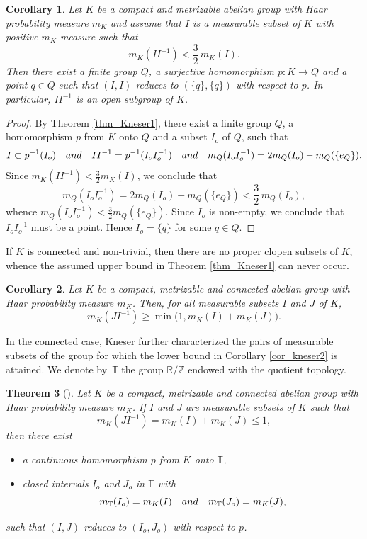 \documentclass[11pt]{article}
\numberwithin{equation}{section}
\newcommand{\bR}{\mathbb{R}}
\newcommand{\bT}{\mathbb{T}}
\newcommand{\bZ}{\mathbb{Z}}
\newcommand{\qand}{\quad\textup{and}\quad}
\theoremstyle{plain}
\newtheorem{theorem}{Theorem}[section]
\newtheorem{corollary}[theorem]{Corollary}
\theoremstyle{definition}
\begin{document}
\begin{corollary}
\label{cor_kneser1}
Let $K$ be a compact and metrizable abelian group with Haar probability measure $m_K$ and assume that $I$ is a measurable
subset of $K$ with positive $m_K$-measure such that
\[
m_K(II^{-1}) < \frac{3}{2}\, m_K(I).
\]
Then there exist a finite group $Q$, a surjective homomorphism $p : K \to Q$ and a point $q \in Q$ such that $(I,I)$ reduces
to $(\{q\},\{q\})$ with respect to $p$. In particular, $II^{-1}$ is an open subgroup of $K$.
\end{corollary}

\begin{proof}
By Theorem \ref{thm_Kneser1}, there exist a finite group $Q$, a homomorphism $p$ from $K$ onto $Q$ and
a subset $I_o$ of $Q$, such that
\[
I \subset p^{-1}(I_o) \qand II^{-1} = p^{-1}(I_o I_o^{-1}) \qand m_Q(I_o I_o^{-1}) = 2m_Q(I_o) - m_Q(\{e_Q\}).
\]
Since $m_K(II^{-1}) < \frac{3}{2} m_K(I)$, we conclude that
\begin{equation}
\label{Qbnd}
m_Q(I_o I_o^{-1}) = 2m_Q(I_o) - m_Q(\{e_Q\}) < \frac{3}{2}\, m_Q(I_o),
\end{equation}
whence $m_Q(I_o I_o^{-1}) < \frac{3}{2} m_Q(\{e_Q\})$. Since $I_o$ is non-empty, we conclude that $I_o I_o^{-1}$ must be a
point. Hence $I_o = \{q\}$ for some $q \in Q$.
\end{proof}

If $K$ is connected and non-trivial, then there are no proper clopen subsets of $K$, whence the assumed upper bound in Theorem \ref{thm_Kneser1}
can never occur.

\begin{corollary}
\label{cor_kneser2}
Let $K$ be a compact, metrizable and connected abelian group with Haar probability measure $m_K$. Then, for all measurable subsets
$I$ and $J$ of $K$,
\[
m_K(JI^{-1}) \geq \min\bigl(1,m_K(I) + m_K(J)\bigr).
\]
\end{corollary}

In the connected case, Kneser further characterized the pairs of measurable subsets of the group for which the lower bound in Corollary \eqref{cor_kneser2}
is attained. We denote by~$\bT$ the group $\bR/\bZ$ endowed with the quotient topology.

\begin{theorem}[{\cite[Satz\,2]{Kneser}}]
\label{thm_Kneser2}
Let $K$ be a compact, metrizable and connected abelian group with Haar probability measure $m_K$. If $I$ and $J$ are measurable
subsets of $K$ such that
\[
m_K(JI^{-1}) = m_K(I) + m_K(J) \leq 1,
\]
then there exist

\begin{itemize}
\item a continuous homomorphism $p$ from $K$ onto $\bT$,
\item closed intervals $I_o$ and $J_o$ in $\bT$ with
\[
m_\bT(I_o) = m_K(I) \qand m_{\bT}(J_o) = m_{K}(J),
\]
\end{itemize}
such that $(I,J)$ reduces to $(I_o,J_o)$ with respect to $p$.
\end{theorem}
\end{document}
